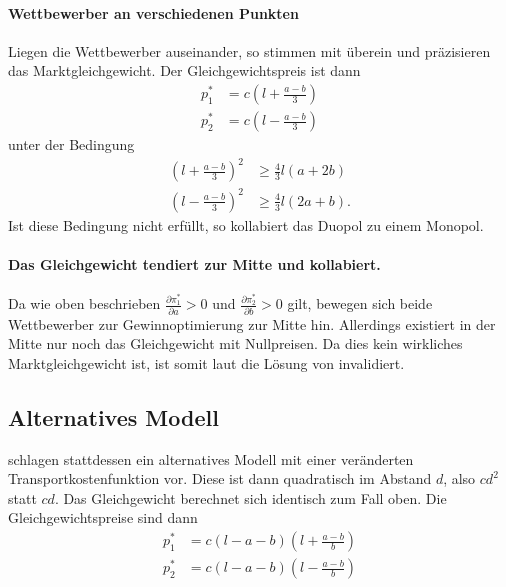 \paragraph{Wettbewerber an verschiedenen Punkten}
Liegen die Wettbewerber auseinander, so stimmen \citet{aspremont1979} mit \citet{hotelling1929} überein und präzisieren das Marktgleichgewicht.
Der Gleichgewichtspreis ist dann
\begin{equation}
\begin{split}
p_1^* &= c \left(l+\frac{a-b}{3}\right) \\
p_2^* &= c \left(l-\frac{a-b}{3}\right)
\end{split}
\end{equation}
unter der Bedingung
\begin{equation}
\begin{split}
\left(l+\frac{a-b}{3}\right)^2 &\geq \tfrac{4}{3} l (a+2b) \\
\left(l-\frac{a-b}{3}\right)^2 &\geq \tfrac{4}{3} l (2a+b)
.\end{split}
\end{equation}
Ist diese Bedingung nicht erfüllt, so kollabiert das Duopol zu einem Monopol. \citep[S.\,1146]{aspremont1979}

\paragraph{Das Gleichgewicht tendiert zur Mitte und kollabiert.}
Da wie oben beschrieben $\frac{\partial \pi_1^*}{\partial a}>0$ und $\frac{\partial \pi_2^*}{\partial b}>0$ gilt, bewegen sich beide Wettbewerber zur Gewinnoptimierung zur Mitte hin.
Allerdings existiert in der Mitte nur noch das Gleichgewicht mit Nullpreisen.
Da dies kein wirkliches Marktgleichgewicht ist, ist somit laut \citet{aspremont1979} die Lösung von \citet{hotelling1929} invalidiert. \citep[S.\,1147-1148]{aspremont1979} 

\subsection{Alternatives Modell}\label{Sec-Aspremont-Modell}
\citet{aspremont1979} schlagen stattdessen ein alternatives Modell mit einer veränderten Transportkostenfunktion vor.
Diese ist dann quadratisch im Abstand $d$, also $cd^2$ statt $cd$.
Das Gleichgewicht berechnet sich identisch zum Fall oben.
Die Gleichgewichtspreise sind dann  \citep[S.\,1149]{aspremont1979}
\begin{equation} \label{eqn:aspremont-prices}
\begin{split}
p_1^* &= c (l-a-b) \left(l+\frac{a-b}{b}\right) \\
p_2^* &= c (l-a-b) \left(l-\frac{a-b}{b}\right)
\end{split}
\end{equation}

